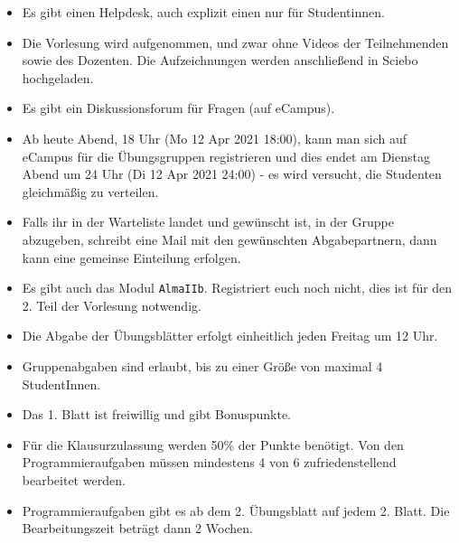 
\begin{itemize}
    \item Es gibt einen Helpdesk, auch explizit einen nur für Studentinnen.
    \item Die Vorlesung wird aufgenommen, und zwar ohne Videos der Teilnehmenden sowie des Dozenten. Die Aufzeichnungen werden anschließend in Sciebo hochgeladen.
    \item Es gibt ein Diskussionsforum für Fragen (auf eCampus).
    \item Ab heute Abend, 18 Uhr (Mo 12 Apr 2021 18:00), kann man sich auf eCampus für die Übungsgruppen registrieren und dies endet am Dienstag Abend um 24 Uhr (Di 12 Apr 2021 24:00) - es wird versucht, die Studenten gleichmäßig zu verteilen.
    \item Falls ihr in der Warteliste landet und gewünscht ist, in der Gruppe abzugeben, schreibt eine Mail mit den gewünschten Abgabepartnern, dann kann eine gemeinse Einteilung erfolgen.
    \item Es gibt auch das Modul \verb?AlmaIIb?. Registriert euch noch nicht, dies ist für den 2. Teil der Vorlesung notwendig. 
    \item Die Abgabe der Übungsblätter erfolgt einheitlich jeden Freitag um 12 Uhr.
    \item Gruppenabgaben sind erlaubt, bis zu einer Größe von maximal 4 StudentInnen.
    \item Das 1. Blatt ist freiwillig und gibt Bonuspunkte.
    \item Für die Klausurzulassung werden 50\% der Punkte benötigt. Von den Programmieraufgaben müssen mindestens 4 von 6 zufriedenstellend bearbeitet werden.
    \item Programmieraufgaben gibt es ab dem 2. Übungsblatt auf jedem 2. Blatt. Die Bearbeitungszeit beträgt dann 2 Wochen.
\end{itemize}


